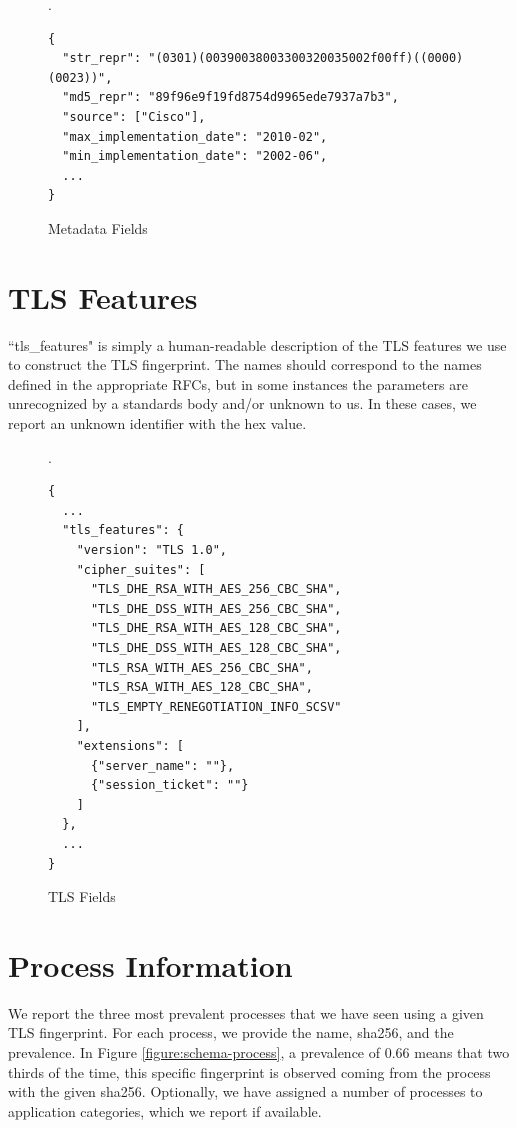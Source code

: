\documentclass{book}
\begin{document}
\begin{figure}[H]\small
  \caption{Metadata Fields}
  \label{figure:schema-metadata}.
\begin{verbatim}
{
  "str_repr": "(0301)(00390038003300320035002f00ff)((0000)(0023))",
  "md5_repr": "89f96e9f19fd8754d9965ede7937a7b3",
  "source": ["Cisco"],
  "max_implementation_date": "2010-02",
  "min_implementation_date": "2002-06",
  ...
}
\end{verbatim}
\end{figure}

\section{TLS Features}

``tls\_features" is simply a human-readable description of the TLS features we use to construct the TLS fingerprint. The names should correspond to the names defined in the appropriate RFCs, but in some instances the parameters are unrecognized by a standards body and/or unknown to us. In these cases, we report an unknown identifier with the hex value.

\begin{figure}[H]\small
  \caption{TLS Fields}
  \label{figure:schema-tls}.
\begin{verbatim}
{
  ...
  "tls_features": {
    "version": "TLS 1.0",
    "cipher_suites": [
      "TLS_DHE_RSA_WITH_AES_256_CBC_SHA",
      "TLS_DHE_DSS_WITH_AES_256_CBC_SHA",
      "TLS_DHE_RSA_WITH_AES_128_CBC_SHA",
      "TLS_DHE_DSS_WITH_AES_128_CBC_SHA",
      "TLS_RSA_WITH_AES_256_CBC_SHA",
      "TLS_RSA_WITH_AES_128_CBC_SHA",
      "TLS_EMPTY_RENEGOTIATION_INFO_SCSV"
    ],
    "extensions": [
      {"server_name": ""},
      {"session_ticket": ""}
    ]
  },
  ...
}
\end{verbatim}
\end{figure}

\section{Process Information}

We report the three most prevalent processes that we have seen using a given TLS fingerprint. For each process, we provide the name, sha256, and the prevalence. In Figure \ref{figure:schema-process}, a prevalence of 0.66 means that two thirds of the time, this specific fingerprint is observed coming from the process with the given sha256. Optionally, we have assigned a number of processes to application categories, which we report if available.
\end{document}
